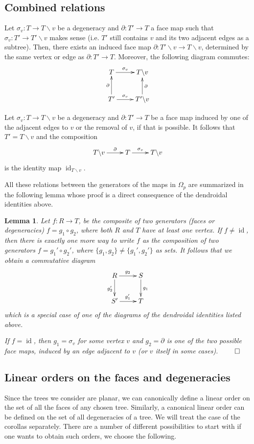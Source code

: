 \documentclass[a4paper]{amsart}
\theoremstyle{plain}
\newtheorem{lem}[thm]{Lemma}
\theoremstyle{definition}
\theoremstyle{remark}
\DeclareMathOperator{\id}{id}
\newcommand{\rpd}{\Omega_p}
\newcommand{\To}{\longrightarrow}
\numberwithin{equation}{section}
\numberwithin{figure}{section}
\begin{document}
\subsection{Combined relations}
Let $\sigma_v:T\To T\backslash v$ be a degeneracy and $\partial:T'\To T$ a face map such that
$\sigma_v:T'\To T'\backslash v$ makes sense (i.e. $T'$ still contains $v$ and its two adjacent edges as a subtree). Then,
there exists an induced face map $\partial:T'\backslash v\To T\backslash v$, determined by the same vertex or edge as
$\partial:T'\To T$. Moreover, the following diagram commutes:
\begin{equation}
\xymatrix{T\ar[r]^-{\sigma_v}&T\backslash v\\
T'\ar[u]^-{\partial}\ar[r]^-{\sigma_v} &T'\backslash v\ar[u]_-{\partial}}
\label{combrel01}
\end{equation}

Let $\sigma_v:T\To T\backslash v$ be a degeneracy and $\partial:T'\To T$ be a face map induced by one of the
adjacent edges to $v$ or the removal of $v$, if that is possible. It follows that $T'=T\backslash v$ and the composition
\begin{equation}
\xymatrix{ T\backslash v\ar[r]^-\partial &T\ar[r]^-{\sigma_v} &T\backslash v}
\label{combrel02}
\end{equation}
is the identity map $\id_{T\backslash v}$.


All these relations between the generators of the maps in $\rpd$ are
summarized in the following lemma whose proof is a direct
consequence of the dendroidal identities above.
\begin{lem}\label{dendroidal identities}
Let $f:R\To T$, be the composite of two generators (faces or degeneracies) $f=g_1\circ g_2$, where both $R$ and $T$ have at least one vertex.
If $f\neq \id$, then there is exactly one more way to write $f$ as the composition of two generators $f=g_1'\circ g_2'$, where
$\{g_1,g_2\}\ne\{g_1',g_2'\}$ as sets.  It follows that we obtain a commutative diagram
$$
\xymatrix{R\ar[r]^{g_2}\ar[d]_{g_2'} &S\ar[d]^{g_1}\\
S'\ar[r]^{g_1'} &T}
$$
which is a special case of one of the diagrams of the dendroidal identities listed above.

If $f=\id$, then $g_1=\sigma_v$ for some vertex $v$ and $g_2=\partial$ is one of the two possible face maps, induced
by an edge adjacent to $v$ (or $v$ itself in some cases).  $\hfill\qed$
\end{lem}

\subsection{Linear orders on the faces and degeneracies}
\label{generorders}
Since the trees we consider are planar, we can canonically define a linear order on the set of all the faces of any chosen tree.
Similarly, a canonical linear order can be defined on the set of all degeneracies of a tree. We will treat the case of the
corollas separately.
There are a number of different possibilities to start with if one wants to obtain such orders, we choose the following.
\end{document}
